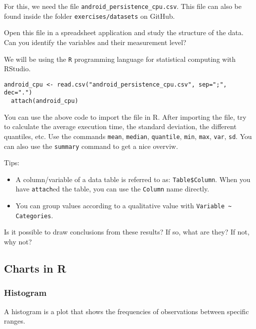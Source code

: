 For this, we need the file \texttt{android\_persistence\_cpu.csv}.
This file can also be found inside the folder \texttt{exercises/datasets} on GitHub.


\begin{exercise}
  \label{oef:casus-akin2016-1var}
  Open this file in a spreadsheet application and study the structure of the data. 
  Can you identify the variables and their measurement level?
\end{exercise}

We will be using the \texttt{R} programming language for statistical computing with RStudio. 

\begin{lstlisting}[breaklines=true]
  android_cpu <- read.csv("android_persistence_cpu.csv", sep=";", dec=".")
  attach(android_cpu)
\end{lstlisting}

You can use the above code to import the file in R. 
After importing the file, try to calculate the average execution time, the standard deviation, the different quantiles, etc.
Use the commands \texttt{mean}, \texttt {median}, \texttt {quantile}, \texttt {min}, \texttt{max}, \texttt{var}, \texttt{sd}. 
You can also use the \texttt{summary} command to get a nice overviw.

Tips:

\begin{itemize}
  \item A column/variable of a data table is referred to as: \verb|Table$Column|. When you have \verb|attach|ed the table, you can use the \verb|Column| name directly.
  \item You can group values according to a qualitative value with \verb|Variable ~ Categories|.
\end{itemize}


\begin{exercise}
  Is it possible to draw conclusions from these results? If so, what are they? If not, why not?
\end{exercise}

\subsection{Charts in R}
\subsubsection{Histogram}

A histogram is a plot that shows the frequencies of observations between specific ranges.

